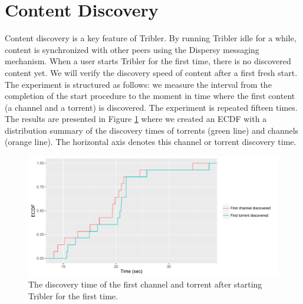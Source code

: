 \section{Content Discovery}
\label{sec:content-discovery}
Content discovery is a key feature of Tribler. By running Tribler idle for a while, content is synchronized with other peers using the Dispersy messaging mechanism. When a user starts Tribler for the first time, there is no discovered content yet. We will verify the discovery speed of content after a first fresh start. The experiment is structured as follows: we measure the interval from the completion of the start procedure to the moment in time where the first content (a channel and a torrent) is discovered. The experiment is repeated fifteen times. The results are presented in Figure \ref{fig:content_discovery_speed} where we created an ECDF with a distribution summary of the discovery times of torrents (green line) and channels (orange line). The horizontal axis denotes this channel or torrent discovery time.\\

\begin{figure}[!h]
	\centering
	\includegraphics[width=1.0\columnwidth]{images/experiments/content_discovery}
	\caption{The discovery time of the first channel and torrent after starting Tribler for the first time.}
	\label{fig:content_discovery_speed}
\end{figure}

